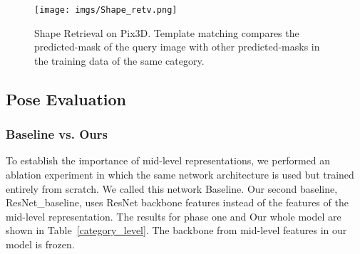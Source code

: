 \documentclass[letterpaper, 10 pt, conference]{ieeeconf}  \pdfoutput=1
\begin{document}
\begin{figure}[htbp]

\begin{center}
\texttt{[image: imgs/Shape\_retv.png]}
\end{center}
   \caption{Shape Retrieval on Pix3D. Template matching compares the predicted-mask of the query image with other predicted-masks in the training data of the same category.}
    \label{shaperetv}
\end{figure}







\subsection{Pose Evaluation}
\subsubsection{Baseline vs. Ours}
To establish the importance of mid-level representations, we performed an ablation experiment in which the same network architecture is used but trained entirely from scratch. We called this network Baseline. Our second baseline, ResNet\_baseline, uses ResNet backbone features instead of the features of the mid-level representation. The results for phase one and Our whole model are shown in Table~\ref{category_level}. The backbone from mid-level features in our model is frozen. 




\begin{table}
\centering
{}
\caption{The choice of mid-level features and the effect on pose classification task with $9$ bins with $2.5^\circ$ overlap.}
\label{mid-level-features}
\end{table}
\end{document}
